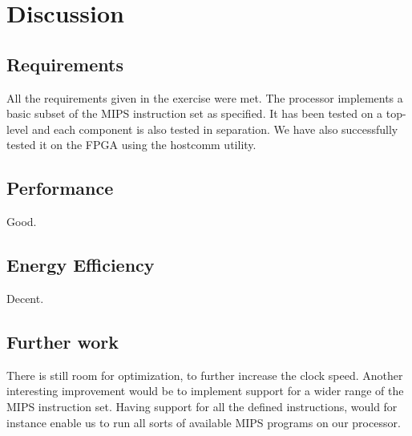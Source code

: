 \section{Discussion}



\subsection{Requirements}
All the requirements given in the exercise were met.
The processor implements a basic subset of the MIPS instruction set\cite[p.64]{compendium} as specified.
It has been tested on a top-level and each component is also tested in separation.
We have also successfully tested it on the FPGA using the hostcomm\cite{hostcomm} utility.

\subsection{Performance}
Good.

\subsection{Energy Efficiency}
Decent.

\subsection{Further work}

There is still room for optimization, to further increase the clock speed.
Another interesting improvement would be to implement support for a wider range of the MIPS instruction set.
Having support for all the defined instructions, would for instance enable us to run all sorts of available MIPS programs on our processor.
